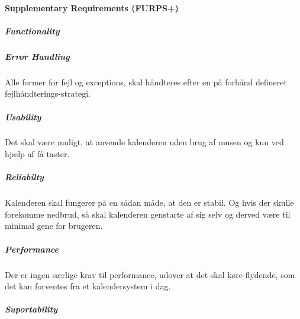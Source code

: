 \documentclass{article}
\begin{document}
   
   \paragraph{Supplementary Requirements (FURPS+)} \mbox{}
   \subparagraph{Functionality} \mbox{}
   
   \subparagraph{Error Handling} \mbox{}
   
   Alle former for fejl og exceptions, skal håndteres efter en på forhånd defineret fejlhåndterings-strategi.
   \subparagraph{Usability} \mbox{}
   
   Det skal være muligt, at anvende kalenderen uden brug af musen og kun ved hjælp af få taster.
   \subparagraph{Reliabilty} \mbox{}
   
   Kalenderen skal fungerer på en sådan måde, at den er stabil. Og hvis der skulle forekomme nedbrud, så skal kalenderen genstarte af sig selv og derved være til minimal gene for brugeren.
   \subparagraph{Performance} \mbox{}
   
   Der er ingen særlige krav til performance, udover at det skal køre flydende, som det kan forventes fra et kalendersystem i dag.
   \subparagraph{Suportability} \mbox{}
   
   
   
   
  
\end{document}
